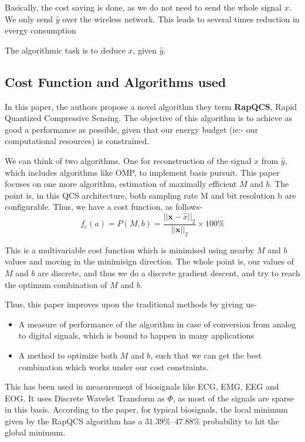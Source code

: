 \documentclass[a4paper,11pt]{article}
\numberwithin{definition}{section}
\numberwithin{mytheorem}{subsection}
\begin{document}
Basically, the cost saving is done, as we do not need to send the whole signal $x$. We only send $\hat{y}$ over the wireless network. This leads to several times reduction in evergy consumption

The algorithmic task is to deduce $x$, given $\hat{y}$.




\subsection{Cost Function and Algorithms used}
In this paper, the authors propose a novel algorithm they term \textbf{RapQCS}, Rapid Quantized Compressive Sensing. The objective of this algorithm is to achieve as good a performance as possible, given that our energy budget (ie:- our computational resources) is constrained.

We can think of two algorithms. One for reconstruction of the signal $x$ from $\hat{y}$, which includes algorithms like OMP, to implement basis pursuit. This paper focuses on one more algorithm, estimation of maximally efficient $M$ and $b$. The point is, in this QCS architecture, both sampling rate M and bit resolution b are configurable. Thus, we have a cost function, as follows-
$$f_c(a) = P(M,b) = \frac{||\boldsymbol{x} - \hat x||_2}{||\boldsymbol{x}||_2} \times 100\%$$

This is a multivariable cost function which is minimised using nearby $M$ and $b$ values and moving in the minimisign direction. The whole point is, our values of $M$ and $b$ are discrete, and thus we do a discrete gradient descent, and try to reach the optimum combination of $M$ and $b$.

Thus, this paper improves upon the traditional methods by giving us-
\begin{itemize}
    \item A measure of performance of the algorithm in case of conversion from analog to digital signals, which is bound to happen in many applications
    \item A method to optimize both $M$ and $b$, such that we can get the best combination which works under our cost constraints.
\end{itemize}

This has been used in measurement of biosignals like ECG, EMG, EEG and EOG. It uses Discrete Wavelet Transform as $\Phi$, as most of the signals are sparse in this basis. According to the paper, for typical biosignals, the local minimum given by the RapQCS algorithm has a $31.39\%–47.88\%$ probability to hit the global minimum.
\end{document}
